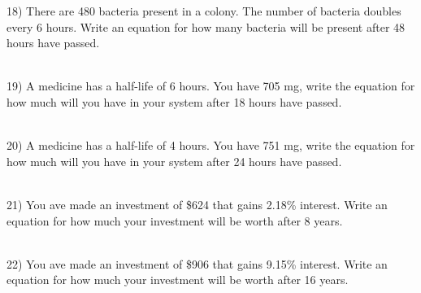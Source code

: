 \documentclass[12pt]{article}
\begin{document}
\begin{minipage}{\textwidth}
\hrulefill





\end{minipage}\begin{minipage}{\textwidth}18) There are 480 bacteria present in a colony. The number of bacteria doubles every 6 hours. Write an equation for how many bacteria will be present after 48 hours have passed. \\ \\
 

\hrulefill






\end{minipage}\begin{minipage}{\textwidth}19) A medicine has a half-life of 6 hours. You have 705 mg, write the equation for how much will you have in your system after 18 hours have passed. \\ \\
 

\hrulefill




\end{minipage}\begin{minipage}{\textwidth}20) A medicine has a half-life of 4 hours. You have 751 mg, write the equation for how much will you have in your system after 24 hours have passed. \\ \\
 

\hrulefill









\end{minipage}\begin{minipage}{\textwidth}21) You ave made an investment of \$624 that gains 2.18\% interest. Write an equation for how much your investment will be worth after 8 years. \\ \\
 

\hrulefill






\end{minipage}\begin{minipage}{\textwidth}22) You ave made an investment of \$906 that gains 9.15\% interest. Write an equation for how much your investment will be worth after 16 years. \\ \\
 


\end{minipage}
\end{document}
